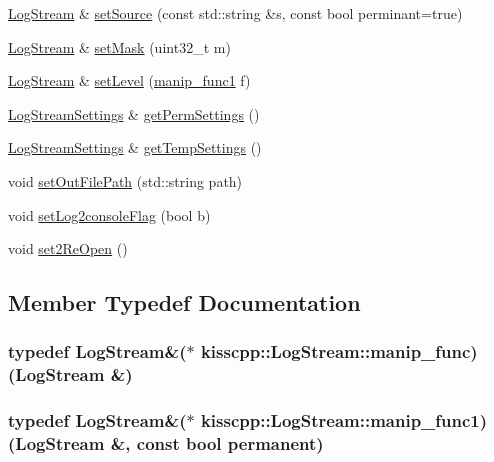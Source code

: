 \begin{DoxyCompactItemize}
\item 
\hyperlink{classkisscpp_1_1_log_stream}{Log\-Stream} \& \hyperlink{classkisscpp_1_1_log_stream_adcc3d0579fa1a4bcf6649274792b27e0}{set\-Source} (const std\-::string \&s, const bool perminant=true)
\item 
\hyperlink{classkisscpp_1_1_log_stream}{Log\-Stream} \& \hyperlink{classkisscpp_1_1_log_stream_a84396dd1702e914bbcd9db9dc1b26194}{set\-Mask} (uint32\-\_\-t m)
\item 
\hyperlink{classkisscpp_1_1_log_stream}{Log\-Stream} \& \hyperlink{classkisscpp_1_1_log_stream_afbccf2eeb34441a14113b29b89c15f88}{set\-Level} (\hyperlink{classkisscpp_1_1_log_stream_ab6994c757d4c63c4388a932cf2be2c9d}{manip\-\_\-func1} f)
\item 
\hyperlink{classkisscpp_1_1_log_stream_settings}{Log\-Stream\-Settings} \& \hyperlink{classkisscpp_1_1_log_stream_a3b4c04dc683fdd8bcf54b3bdcb2906a0}{get\-Perm\-Settings} ()
\item 
\hyperlink{classkisscpp_1_1_log_stream_settings}{Log\-Stream\-Settings} \& \hyperlink{classkisscpp_1_1_log_stream_a7a5c468e5c33c028737a733c7510bc74}{get\-Temp\-Settings} ()
\item 
void \hyperlink{classkisscpp_1_1_log_stream_afb35292a073160d5fc74b1e94512226e}{set\-Out\-File\-Path} (std\-::string path)
\item 
void \hyperlink{classkisscpp_1_1_log_stream_ab9813d6efb18c2533dd0489306af5f3d}{set\-Log2console\-Flag} (bool b)
\item 
void \hyperlink{classkisscpp_1_1_log_stream_a739a620e8f2e957e79cfbdd3e7f58500}{set2\-Re\-Open} ()
\end{DoxyCompactItemize}


\subsection{Member Typedef Documentation}
\hypertarget{classkisscpp_1_1_log_stream_abb058ef2b1b57fb7e0b89c3312794ada}{
\subsubsection[{manip\-\_\-func}]{\setlength{\rightskip}{0pt plus 5cm}typedef {\bf Log\-Stream}\&($\ast$ kisscpp\-::\-Log\-Stream\-::manip\-\_\-func)({\bf Log\-Stream} \&)}}\label{classkisscpp_1_1_log_stream_abb058ef2b1b57fb7e0b89c3312794ada}
\hypertarget{classkisscpp_1_1_log_stream_ab6994c757d4c63c4388a932cf2be2c9d}{
\subsubsection[{manip\-\_\-func1}]{\setlength{\rightskip}{0pt plus 5cm}typedef {\bf Log\-Stream}\&($\ast$ kisscpp\-::\-Log\-Stream\-::manip\-\_\-func1)({\bf Log\-Stream} \&, const bool permanent)}}\label{classkisscpp_1_1_log_stream_ab6994c757d4c63c4388a932cf2be2c9d}


